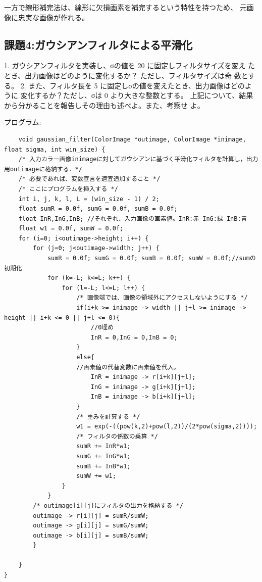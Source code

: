 \documentclass[a4paper,titlepage,11pt]{ltjsarticle}
\begin{document}
一方で線形補完法は、線形に欠損画素を補完するという特性を持つため、
元画像に忠実な画像が作れる。

\subsection*{課題4:ガウシアンフィルタによる平滑化}
1. ガウシアンフィルタを実装し、σの値を 20 に固定しフィルタサイズを変え
たとき、出力画像はどのように変化するか？ ただし、フィルタサイズは奇
数とする。
2. また、フィルタ長を 5 に固定しσの値を変えたとき、出力画像はどのように
変化するか？ただし、σは 0 より大きな整数とする。
上記について、結果から分かることを報告しその理由も述べよ。また、考察せ
よ。

プログラム:
\begin{lstlisting}
	void gaussian_filter(ColorImage *outimage, ColorImage *inimage, float sigma, int win_size) {
    /* 入力カラー画像inimageに対してガウシアンに基づく平滑化フィルタを計算し，出力用outimageに格納する．*/
    /* 必要であれば、変数宣言を適宜追加すること */
    /* ここにプログラムを挿入する */
    int i, j, k, l, L = (win_size - 1) / 2;
    float sumR = 0.0f, sumG = 0.0f, sumB = 0.0f;
    float InR,InG,InB; //それぞれ、入力画像の画素値。InR:赤 InG:緑 InB:青
    float w1 = 0.0f, sumW = 0.0f;
    for (i=0; i<outimage->height; i++) {
        for (j=0; j<outimage->width; j++) {
            sumR = 0.0f; sumG = 0.0f; sumB = 0.0f; sumW = 0.0f;//sumの初期化
            for (k=-L; k<=L; k++) {
                for (l=-L; l<=L; l++) {
                    /* 画像端では、画像の領域外にアクセスしないようにする */
                    if(i+k >= inimage -> width || j+l >= inimage -> height || i+k <= 0 || j+l <= 0){
                        //0埋め
                        InR = 0,InG = 0,InB = 0;
                    }
                    else{
                    //画素値の代替変数に画素値を代入。
                        InR = inimage -> r[i+k][j+l];
                        InG = inimage -> g[i+k][j+l];
                        InB = inimage -> b[i+k][j+l];
                    }
                    /* 重みを計算する */
                    w1 = exp(-((pow(k,2)+pow(l,2))/(2*pow(sigma,2))));
                    /* フィルタの係数の乗算 */
                    sumR += InR*w1;
                    sumG += InG*w1;
                    sumB += InB*w1;
                    sumW += w1;
                }
            }
        /* outimage[i][j]にフィルタの出力を格納する */
        outimage -> r[i][j] = sumR/sumW;
        outimage -> g[i][j] = sumG/sumW;
        outimage -> b[i][j] = sumB/sumW; 
        }

    }
}
\end{lstlisting}
\end{document}
